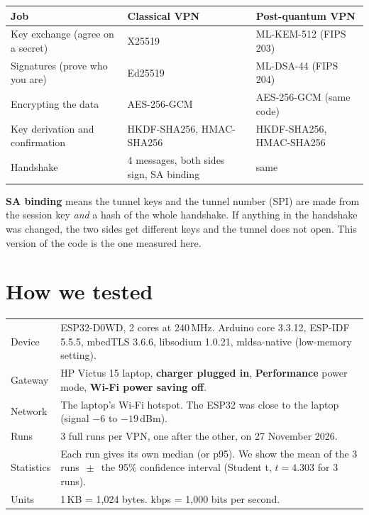 \documentclass[10pt,a4paper]{article}
\newcommand{\PM}{\ensuremath{\,\pm\,}}
\begin{document}
\begin{table}[H]\centering\small
\begin{tabularx}{\linewidth}{lLL}
\toprule
Job & Classical VPN & Post-quantum VPN \\
\midrule
Key exchange (agree on a secret) & X25519 & ML-KEM-512 (FIPS 203) \\
Signatures (prove who you are)   & Ed25519 & ML-DSA-44 (FIPS 204) \\
Encrypting the data              & AES-256-GCM & AES-256-GCM (same code) \\
Key derivation and confirmation  & HKDF-SHA256, HMAC-SHA256 & HKDF-SHA256, HMAC-SHA256 \\
Handshake                        & 4 messages, both sides sign, SA binding & same \\
\bottomrule
\end{tabularx}
\end{table}

\textbf{SA binding} means the tunnel keys and the tunnel number (SPI) are made from the session key
\emph{and} a hash of the whole handshake. If anything in the handshake was changed, the two sides get
different keys and the tunnel does not open. This version of the code is the one measured here.

\section{How we tested}

\begin{table}[H]\centering\small
\begin{tabularx}{\linewidth}{lL}
\toprule
Device & ESP32-D0WD, 2 cores at 240\,MHz. Arduino core 3.3.12, ESP-IDF 5.5.5, mbedTLS 3.6.6,
         libsodium 1.0.21, mldsa-native (low-memory setting). \\
Gateway & HP Victus 15 laptop, \textbf{charger plugged in}, \textbf{Performance} power mode,
          \textbf{Wi-Fi power saving off}. \\
Network & The laptop's Wi-Fi hotspot. The ESP32 was close to the laptop (signal $-6$ to $-19$\,dBm). \\
Runs & 3 full runs per VPN, one after the other, on 27 November 2026. \\
Statistics & Each run gives its own median (or p95). We show the mean of the 3 runs
             $\PM$ the 95\% confidence interval (Student t, $t = 4.303$ for 3 runs). \\
Units & 1\,KB = 1,024 bytes. kbps = 1,000 bits per second. \\
\bottomrule
\end{tabularx}
\end{table}
\end{document}
